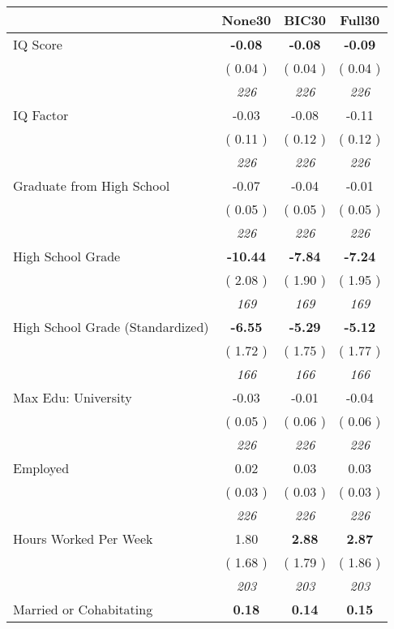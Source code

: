 \begin{tabular}{l c c c}
\toprule
 & None30 & BIC30 & Full30 \\
\midrule
IQ Score & \textbf{     -0.08 } & \textbf{     -0.08 } & \textbf{     -0.09 } \\
& (     0.04 ) & (     0.04 ) & (     0.04 ) \\
& \textit{ 226 } & \textit{ 226 } & \textit{ 226 } \\
IQ Factor &     -0.03 &     -0.08 &     -0.11 \\
& (     0.11 ) & (     0.12 ) & (     0.12 ) \\
& \textit{ 226 } & \textit{ 226 } & \textit{ 226 } \\
Graduate from High School &     -0.07 &     -0.04 &     -0.01 \\
& (     0.05 ) & (     0.05 ) & (     0.05 ) \\
& \textit{ 226 } & \textit{ 226 } & \textit{ 226 } \\
High School Grade & \textbf{    -10.44 } & \textbf{     -7.84 } & \textbf{     -7.24 } \\
& (     2.08 ) & (     1.90 ) & (     1.95 ) \\
& \textit{ 169 } & \textit{ 169 } & \textit{ 169 } \\
High School Grade (Standardized) & \textbf{     -6.55 } & \textbf{     -5.29 } & \textbf{     -5.12 } \\
& (     1.72 ) & (     1.75 ) & (     1.77 ) \\
& \textit{ 166 } & \textit{ 166 } & \textit{ 166 } \\
Max Edu: University &     -0.03 &     -0.01 &     -0.04 \\
& (     0.05 ) & (     0.06 ) & (     0.06 ) \\
& \textit{ 226 } & \textit{ 226 } & \textit{ 226 } \\
Employed &      0.02 &      0.03 &      0.03 \\
& (     0.03 ) & (     0.03 ) & (     0.03 ) \\
& \textit{ 226 } & \textit{ 226 } & \textit{ 226 } \\
Hours Worked Per Week &      1.80 & \textbf{      2.88 } & \textbf{      2.87 } \\
& (     1.68 ) & (     1.79 ) & (     1.86 ) \\
& \textit{ 203 } & \textit{ 203 } & \textit{ 203 } \\
Married or Cohabitating & \textbf{      0.18 } & \textbf{      0.14 } & \textbf{      0.15 } \\

\end{tabular}
